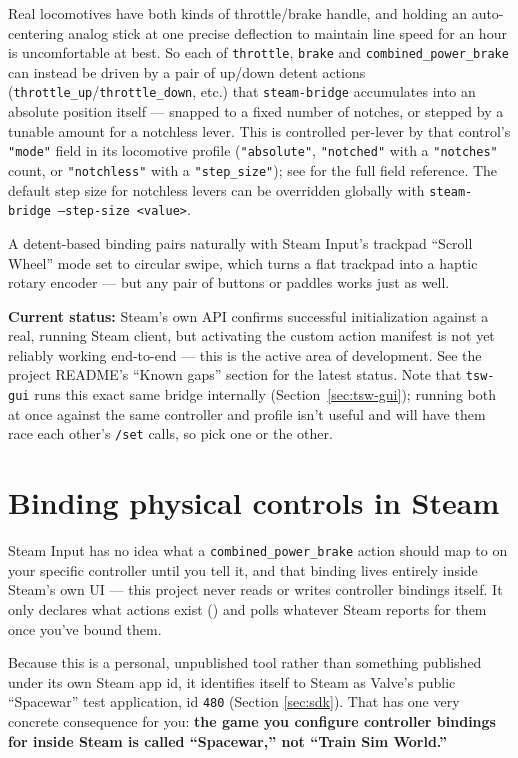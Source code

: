 \documentclass[11pt,a4paper]{article}
\newcommand{\code}[1]{\texttt{#1}}
\begin{document}
Real locomotives have both kinds of throttle/brake handle, and holding an
auto-centering analog stick at one precise deflection to maintain line
speed for an hour is uncomfortable at best. So each of \code{throttle},
\code{brake} and \code{combined\_power\_brake} can instead be driven by a
pair of up/down detent actions (\code{throttle\_up}/\code{throttle\_down},
etc.) that \code{steam-bridge} accumulates into an absolute position
itself --- snapped to a fixed number of notches, or stepped by a tunable
amount for a notchless lever. This is controlled per-lever by that
control's \code{"mode"} field in its locomotive profile
(\code{"absolute"}, \code{"notched"} with a \code{"notches"} count, or
\code{"notchless"} with a \code{"step\_size"}); see
 for the full field reference. The default step
size for notchless levers can be overridden globally with
\code{steam-bridge --step-size <value>}.

A detent-based binding pairs naturally with Steam Input's trackpad
``Scroll Wheel'' mode set to circular swipe, which turns a flat trackpad
into a haptic rotary encoder --- but any pair of buttons or paddles works
just as well.

\textbf{Current status:} Steam's own API confirms successful
initialization against a real, running Steam client, but activating the
custom action manifest is not yet reliably working end-to-end --- this is
the active area of development. See the project README's ``Known gaps''
section for the latest status. Note that \code{tsw-gui} runs this exact
same bridge internally (Section~\ref{sec:tsw-gui}); running both at once
against the same controller and profile isn't useful and will have them
race each other's \code{/set} calls, so pick one or the other.

\section{Binding physical controls in Steam}
\label{sec:steam-binding}

Steam Input has no idea what a \code{combined\_power\_brake} action
should map to on your specific controller until you tell it, and that
binding lives entirely inside Steam's own UI --- this project never reads
or writes controller bindings itself. It only declares what actions exist
() and polls whatever Steam reports
for them once you've bound them.

Because this is a personal, unpublished tool rather than something
published under its own Steam app id, it identifies itself to Steam as
Valve's public ``Spacewar'' test application, id \code{480} (Section
\ref{sec:sdk}). That has one very concrete consequence for you: \textbf{the
game you configure controller bindings for inside Steam is called
``Spacewar,'' not ``Train Sim World.''}
\end{document}
